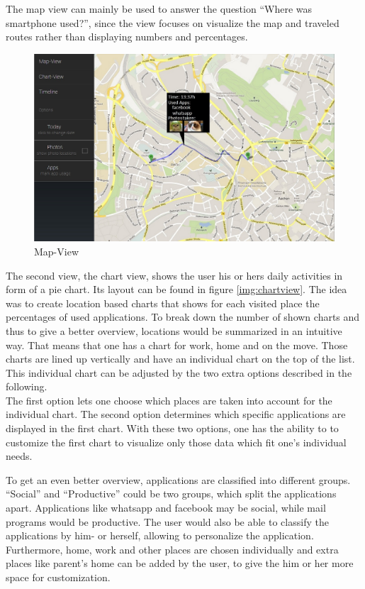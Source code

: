 The map view can mainly be used to answer the question ``Where was smartphone used?'', since the view focuses on visualize the map and traveled routes rather than displaying numbers and percentages.
\begin{figure}[h]
	\caption{Map-View}
	\label{img:mapview}
	\includegraphics[width=\textwidth]{images/Design/1b_onClickPageView.jpg}
\end{figure}

The  second view, the chart view, shows the user his or hers daily activities in form of a pie chart. Its layout can be found in figure \ref{img:chartview}. The idea was to create location based charts that shows for each visited place the percentages of used applications. To break down the number of shown charts and thus to give a better overview, locations would be summarized in an intuitive way. That means that one has a chart for work, home and on the move. Those charts are lined up vertically and have an individual chart on the top of the list. This individual chart can be adjusted by the two extra options described in the following.\\
The  first option lets one choose which places are taken into account for the individual chart. The second option determines which specific applications are displayed in the first chart. With these two options, one has the ability to to customize the first chart to visualize only those data which fit one's individual needs.

To  get an even better overview, applications are classified into different groups. ``Social'' and ``Productive'' could be two groups, which split the applications apart. Applications like whatsapp and facebook may be social, while mail programs would be productive. The user would also be able to classify the applications by him- or herself, allowing to personalize the application. Furthermore, home, work and other places are chosen individually and extra places like parent's home can be added by the user, to give the him or her more space for customization.

